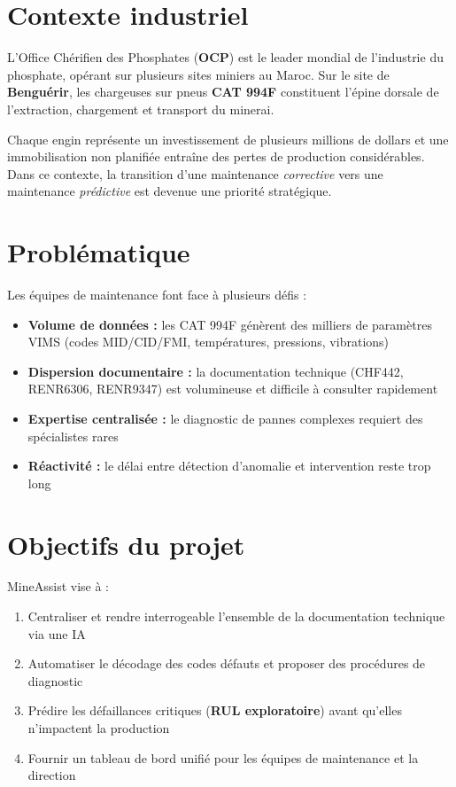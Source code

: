 \documentclass[12pt,a4paper]{report}
\begin{document}
\section{Contexte industriel}

L'Office Chérifien des Phosphates (\textbf{OCP}) est le leader mondial de l'industrie du phosphate,
opérant sur plusieurs sites miniers au Maroc. Sur le site de \textbf{Benguérir}, les chargeuses
sur pneus \textbf{CAT 994F} constituent l'épine dorsale de l'extraction, chargement et
transport du minerai.

Chaque engin représente un investissement de plusieurs millions de dollars et une immobilisation
non planifiée entraîne des pertes de production considérables. Dans ce contexte, la transition
d'une maintenance \emph{corrective} vers une maintenance \emph{prédictive} est devenue
une priorité stratégique.

\section{Problématique}

Les équipes de maintenance font face à plusieurs défis :

\begin{itemize}
  \item \textbf{Volume de données :} les CAT 994F génèrent des milliers de paramètres VIMS
  (codes MID/CID/FMI, températures, pressions, vibrations)
  \item \textbf{Dispersion documentaire :} la documentation technique (CHF442, RENR6306,
  RENR9347) est volumineuse et difficile à consulter rapidement
  \item \textbf{Expertise centralisée :} le diagnostic de pannes complexes requiert
  des spécialistes rares
  \item \textbf{Réactivité :} le délai entre détection d'anomalie et intervention
  reste trop long
\end{itemize}

\section{Objectifs du projet}

MineAssist vise à :
\begin{enumerate}
  \item Centraliser et rendre interrogeable l'ensemble de la documentation technique via une IA
  \item Automatiser le décodage des codes défauts et proposer des procédures de diagnostic
  \item Prédire les défaillances critiques (\textbf{RUL exploratoire}) avant qu'elles n'impactent la production
  \item Fournir un tableau de bord unifié pour les équipes de maintenance et la direction
\end{enumerate}
\end{document}
